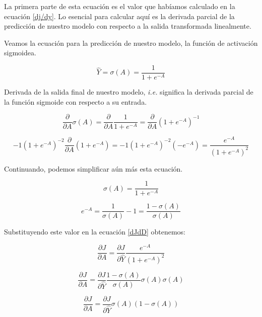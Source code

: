 \documentclass[a4paper,12pt]{article}
\begin{document}
La primera parte de esta ecuación es el valor que habíamos calculado en la ecuación \ref{dj/dy}. Lo esencial para calcular aquí es la derivada parcial de la predicción de nuestro modelo con respecto a la salida transformada linealmente.

Veamos la ecuación para la predicción de nuestro modelo, la función de activación sigmoidea.

\begin{equation}
\hat{Y} = \sigma(A) = \frac{1}{1+e^{-A}}
\end{equation}

Derivada de la salida final de nuestro modelo, \textit{i.e.} significa la derivada parcial de la función sigmoide con respecto a su entrada.

\begin{equation}
\frac{\partial}{\partial A} \sigma (A) = \frac{\partial}{\partial A} \frac{1}{1+e^{-A}} = \frac{\partial}{\partial A} (1+e^{-A})^{-1}
\end{equation}

\begin{equation}
 -1  (1+e^{-A})^{-2} \frac{\partial}{\partial A} (1+e^{-A}) = -1  (1+e^{-A})^{-2} (-e^{-A}) = \frac{e^{-A}}{(1+e^{-A})^2}
\end{equation}

Continuando, podemos simplificar aún más esta ecuación.

\begin{equation}
\sigma(A) = \frac{1}{1+e^{-A}}
\end{equation}

\begin{equation}
e^{-A} = \frac{1}{\sigma (A)} - 1 = \frac{1-\sigma (A)}{\sigma(A)}
\end{equation}

Substituyendo este valor en la ecuación \ref{dJdD} obtenemos:

\begin{equation}
\frac{\partial J}{\partial A} = \frac{\partial J}{\partial \hat{Y}} \frac{e^{-A}}{(1+e^{-A})^2}
\end{equation}

\begin{equation}
\frac{\partial J}{\partial A} = \frac{\partial J} {\partial \hat{Y} } \frac{1-\sigma(A)}{\sigma(A)} \sigma (A) \sigma (A)
\end{equation}

\begin{equation}
\frac{\partial J}{\partial A} = \frac{\partial J} {\partial \hat{Y}} \sigma(A) (1-\sigma(A))
\end{equation}
\end{document}
